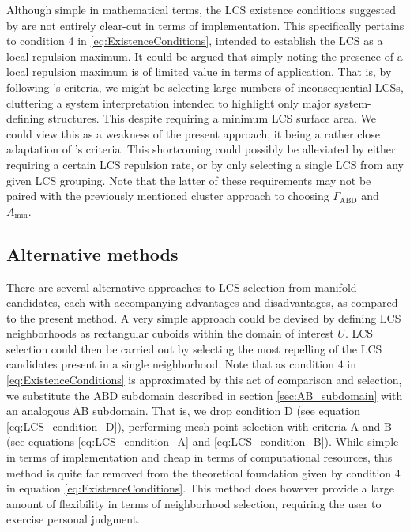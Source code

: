 Although simple in mathematical terms, the LCS existence conditions suggested by \cite{Haller12} are not entirely clear-cut in terms of implementation. This specifically pertains to condition 4 in \eqref{eq:ExistenceConditions}, intended to establish the LCS as a local repulsion maximum. It could be argued that simply noting the presence of a local repulsion maximum is of limited value in terms of application. That is, by following \cite{Haller14}'s criteria, we might be selecting large numbers of inconsequential LCSs, cluttering a system interpretation intended to highlight only major system-defining structures. This despite requiring a minimum LCS surface area. We could view this as a weakness of the present approach, it being a rather close adaptation of \cite{Haller12}'s criteria. This shortcoming could possibly be alleviated by either requiring a certain LCS repulsion rate, or by only selecting a single LCS from any given LCS grouping. Note that the latter of these requirements may not be paired with the previously mentioned cluster approach to choosing $\Gamma_{\text{ABD}}$ and $A_{\text{min}}$.


\subsection{Alternative methods}\label{sec:selection_alternative_methods}

There are several alternative approaches to LCS selection from manifold candidates, each with accompanying advantages and disadvantages, as compared to the present method. A very simple approach could be devised by defining LCS neighborhoods as rectangular cuboids within the domain of interest  $U$. LCS selection could then be carried out by selecting the most repelling of the LCS candidates present in a single neighborhood. Note that as condition $4$ in \eqref{eq:ExistenceConditions} is approximated by this act of comparison and selection, we substitute the ABD subdomain described in section \ref{sec:AB_subdomain} with an analogous AB subdomain. That is, we drop condition D (see equation \eqref{eq:LCS_condition_D}), performing mesh point selection with criteria A and B (see equations \eqref{eq:LCS_condition_A} and \eqref{eq:LCS_condition_B}). While simple in terms of implementation and cheap in terms of computational resources, this method is quite far removed from the theoretical foundation given by condition $4$ in equation \eqref{eq:ExistenceConditions}. This method does however provide a large amount of flexibility in terms of neighborhood selection, requiring the user to exercise personal judgment.

